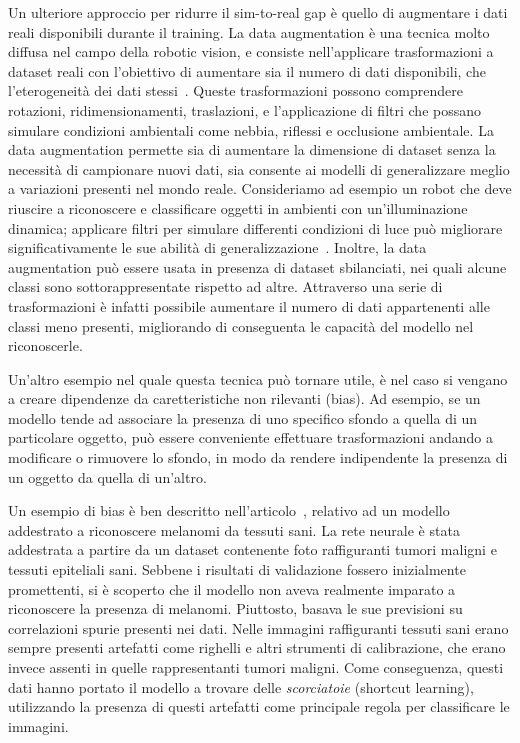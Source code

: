 \documentclass[12pt]{report}
\begin{document}
Un ulteriore approccio per ridurre il sim-to-real gap è quello di augmentare i dati reali disponibili durante il training. La data augmentation è una tecnica molto diffusa nel campo della robotic vision, e consiste nell'applicare trasformazioni a dataset reali con l'obiettivo di aumentare sia il numero di dati disponibili, che l'eterogeneità dei dati stessi~\cite{Shorten2019}. Queste trasformazioni possono comprendere rotazioni, ridimensionamenti, traslazioni, e l'applicazione di filtri che possano simulare condizioni ambientali come nebbia, riflessi e occlusione ambientale. La data augmentation permette sia di aumentare la dimensione di dataset senza la necessità di campionare nuovi dati, sia consente ai modelli di generalizzare meglio a variazioni presenti nel mondo reale. Consideriamo ad esempio un robot che deve riuscire a riconoscere e classificare oggetti in ambienti con un'illuminazione dinamica; applicare filtri per simulare differenti condizioni di luce può migliorare significativamente le sue abilità di generalizzazione~\cite{NEURIPS2021_fb4c4860}. Inoltre, la data augmentation può essere usata in presenza di dataset sbilanciati, nei quali alcune classi sono sottorappresentate rispetto ad altre. Attraverso una serie di trasformazioni è infatti possibile aumentare il numero di dati appartenenti alle classi meno presenti, migliorando di conseguenta le capacità del modello nel riconoscerle.

Un'altro esempio nel quale questa tecnica può tornare utile, è nel caso si vengano a creare dipendenze da caretteristiche non rilevanti (bias). Ad esempio, se un modello tende ad associare la presenza di uno specifico sfondo a quella di un particolare oggetto, può essere conveniente effettuare trasformazioni andando a modificare o rimuovere lo sfondo, in modo da rendere indipendente la presenza di un oggetto da quella di un'altro.

Un esempio di bias è ben descritto nell'articolo~\cite{diagnostics12010040}, relativo ad un modello addestrato a riconoscere melanomi da tessuti sani. La rete neurale è stata addestrata a partire da un dataset contenente foto raffiguranti tumori maligni e tessuti epiteliali sani. Sebbene i risultati di validazione fossero inizialmente promettenti, si è scoperto che il modello non aveva realmente imparato a riconoscere la presenza di melanomi. Piuttosto, basava le sue previsioni su correlazioni spurie presenti nei dati. Nelle immagini raffiguranti tessuti sani erano sempre presenti artefatti come righelli e altri strumenti di calibrazione, che erano invece assenti in quelle rappresentanti tumori maligni. Come conseguenza, questi dati hanno portato il modello a trovare delle \textit{scorciatoie} (shortcut learning), utilizzando la presenza di questi artefatti come principale regola per classificare le immagini.
\end{document}
